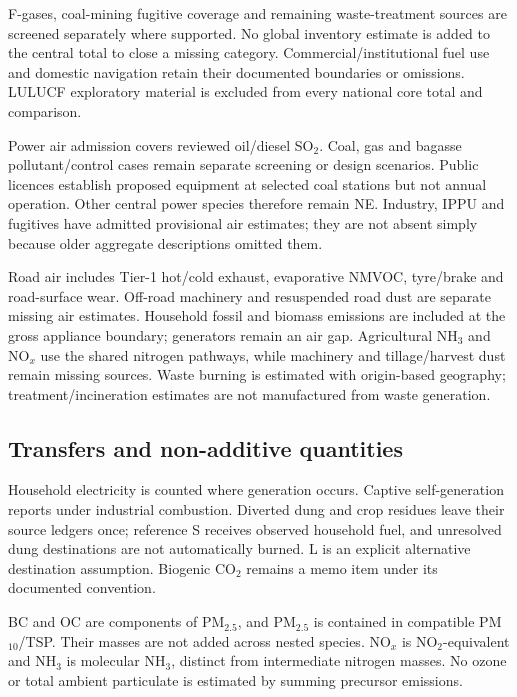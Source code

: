F-gases, coal-mining fugitive coverage and remaining waste-treatment sources are screened separately where supported. No global inventory estimate is added to the central total to close a missing category. Commercial/institutional fuel use and domestic navigation retain their documented boundaries or omissions. LULUCF exploratory material is excluded from every national core total and comparison.

Power air admission covers reviewed oil/diesel SO$_2$. Coal, gas and bagasse pollutant/control cases remain separate screening or design scenarios. Public licences establish proposed equipment at selected coal stations but not annual operation. Other central power species therefore remain NE. Industry, IPPU and fugitives have admitted provisional air estimates; they are not absent simply because older aggregate descriptions omitted them.

Road air includes Tier-1 hot/cold exhaust, evaporative NMVOC, tyre/brake and road-surface wear. Off-road machinery and resuspended road dust are separate missing air estimates. Household fossil and biomass emissions are included at the gross appliance boundary; generators remain an air gap. Agricultural NH$_3$ and NO$_x$ use the shared nitrogen pathways, while machinery and tillage/harvest dust remain missing sources. Waste burning is estimated with origin-based geography; treatment/incineration estimates are not manufactured from waste generation.

\subsection{Transfers and non-additive quantities}
Household electricity is counted where generation occurs. Captive self-generation reports under industrial combustion. Diverted dung and crop residues leave their source ledgers once; reference S receives observed household fuel, and unresolved dung destinations are not automatically burned. L is an explicit alternative destination assumption. Biogenic CO$_2$ remains a memo item under its documented convention.

BC and OC are components of PM$_{2.5}$, and PM$_{2.5}$ is contained in compatible PM$_{10}$/TSP. Their masses are not added across nested species. NO$_x$ is NO$_2$-equivalent and NH$_3$ is molecular NH$_3$, distinct from intermediate nitrogen masses. No ozone or total ambient particulate is estimated by summing precursor emissions.
